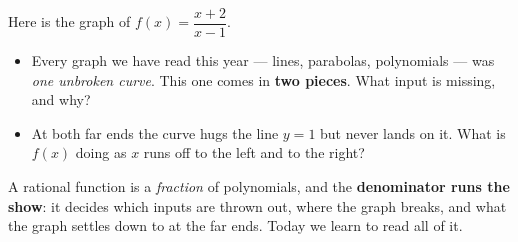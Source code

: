 \documentclass[10pt]{article}
\newcommand{\lgrid}[4]{%
  \draw[step=1, linegray!40, very thin] (#1,#3) grid (#2,#4);
  \draw[->, semithick, charcoal] (#1,0)--(#2,0) node[below right, font=\scriptsize]{$x$};
  \draw[->, semithick, charcoal] (0,#3)--(0,#4) node[left, font=\scriptsize]{$y$};}
\begin{document}
\begin{hookbox}
Here is the graph of $f(x) = \dfrac{x+2}{x-1}$.
\begin{center}
\end{center}
\begin{itemize}\setlength{\itemsep}{1pt}
  \item Every graph we have read this year --- lines, parabolas, polynomials --- was \emph{one unbroken curve}. This one comes in \textbf{two pieces}. What input is missing, and why? \writeline
  \item At both far ends the curve hugs the line $y=1$ but never lands on it. What is $f(x)$ doing as $x$ runs off to the left and to the right? \writeline
\end{itemize}
A rational function is a \emph{fraction} of polynomials, and the \textbf{denominator runs the show}:
it decides which inputs are thrown out, where the graph breaks, and what the graph settles down to at
the far ends. Today we learn to read all of it.
\end{hookbox}
\end{document}
